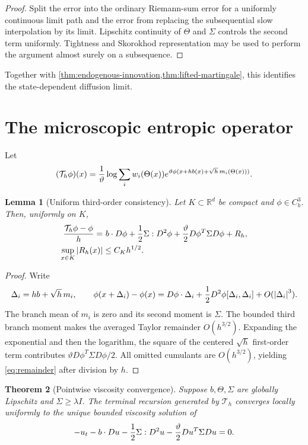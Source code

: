\documentclass[11pt,reqno]{amsart}
\newtheorem{theorem}{Theorem}[section]
\newtheorem{lemma}[theorem]{Lemma}
\theoremstyle{definition}
\newcommand{\R}{\mathbb R}
\newcommand{\abs}[1]{\left\lvert#1\right\rvert}
\begin{document}
\begin{proof}
Split the error into the ordinary Riemann-sum error for a uniformly continuous
limit path and the error from replacing the subsequential slow interpolation
by its limit.  Lipschitz continuity of $\Theta$ and $\Sigma$ controls the
second term uniformly.  Tightness and Skorokhod representation may be used to
perform the argument almost surely on a subsequence.
\end{proof}

Together with \cref{thm:endogenous-innovation,thm:lifted-martingale}, this
identifies the state-dependent diffusion limit.

\section{The microscopic entropic operator}

Let
\[
 (\mathcal T_h\phi)(x)={1\over\vartheta}
 \log\sum_iw_i(\Theta(x))
 e^{\vartheta\phi(x+hb(x)+\sqrt h\,m_i(\Theta(x)))}.
\]

\begin{lemma}[Uniform third-order consistency]\label{lem:uniform-consistency}
Let $K\subset\R^d$ be compact and $\phi\in C_b^3$.  Then, uniformly on $K$,
\begin{align}
 {\mathcal T_h\phi-\phi\over h}
 =&\ b\cdot D\phi+{1\over2}\Sigma:D^2\phi
 +{\vartheta\over2}D\phi^T\Sigma D\phi+R_h,\\
 \sup_{x\in K}\abs{R_h(x)}&\le C_Kh^{1/2}.
 \label{eq:remainder}
\end{align}
\end{lemma}

\begin{proof}
Write
\[
 \Delta_i=hb+\sqrt h\,m_i,
 \qquad
 \phi(x+\Delta_i)-\phi(x)
 =D\phi\cdot\Delta_i+{1\over2}D^2\phi[\Delta_i,\Delta_i]
 +O(\abs{\Delta_i}^3).
\]
The branch mean of $m_i$ is zero and its second moment is $\Sigma$.
The bounded third branch moment makes the averaged Taylor remainder
$O(h^{3/2})$.  Expanding the exponential and then the logarithm, the square of
the centered $\sqrt h$ first-order term contributes
$\vartheta D\phi^T\Sigma D\phi/2$.  All omitted cumulants are
$O(h^{3/2})$, yielding \eqref{eq:remainder} after division by $h$.
\end{proof}

\begin{theorem}[Pointwise viscosity convergence]\label{thm:pointwise-viscosity}
Suppose $b,\Theta,\Sigma$ are globally Lipschitz and
$\Sigma\ge\lambda I$.  The terminal recursion generated by $\mathcal T_h$
converges locally uniformly to the unique bounded viscosity solution of
\[
 -u_t-b\cdot Du-{1\over2}\Sigma:D^2u
 -{\vartheta\over2}Du^T\Sigma Du=0.
\]
\end{theorem}
\end{document}
